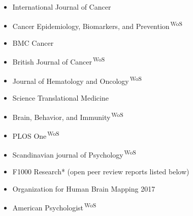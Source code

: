 \documentclass[10pt,a4paper,twocolumn]{article}
\begin{document}
\begin{itemize}
    \begin{itemize}
    
        
        \item International Journal of Cancer
        
    
        
        \item Cancer Epidemiology, Biomarkers, and Prevention\textsuperscript{\,\scriptsize WoS}
        
    
        
        \item BMC Cancer
        
    
        
        \item British Journal of Cancer\textsuperscript{\,\scriptsize WoS}
        
    
        
        \item Journal of Hematology and Oncology\textsuperscript{\,\scriptsize WoS}
        
    
        
        \item Science Translational Medicine
        
    
        
        \item Brain, Behavior, and Immunity\textsuperscript{\,\scriptsize WoS}
        
    
        
        \item PLOS One\textsuperscript{\,\scriptsize WoS}
        
    
        
        \item Scandinavian journal of Psychology\textsuperscript{\,\scriptsize WoS}
        
    
        
        \item F1000 Research* (open peer review reports listed below)
        
    
        
        \item Organization for Human Brain Mapping 2017
        
    
        
        \item American Psychologist\textsuperscript{\,\scriptsize WoS}
        
    
        

\end{itemize}
\end{itemize}
\end{document}
